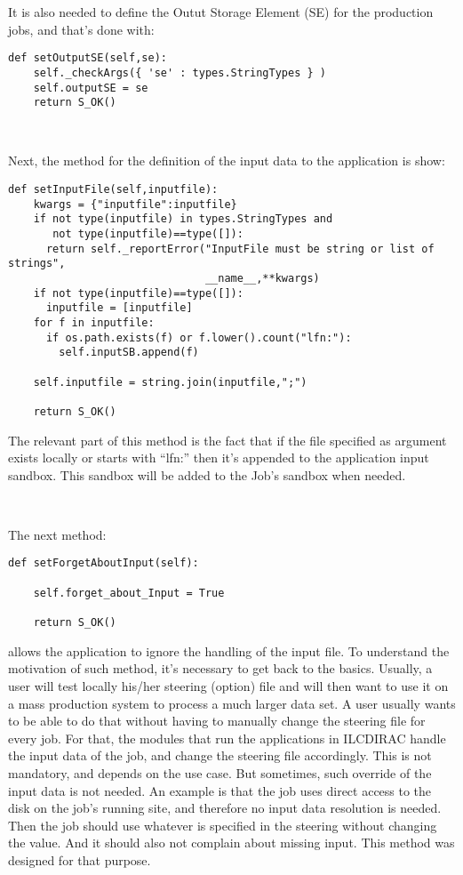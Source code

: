 \documentclass[a4paper,12pt]{article}
\begin{document}
It is also needed to define the Outut Storage Element (SE) for the production
jobs, and that's done with:
\begin{lstlisting}[firstnumber=210]  
  def setOutputSE(self,se):
    self._checkArgs({ 'se' : types.StringTypes } )
    self.outputSE = se
    return S_OK()
\end{lstlisting}

~

Next, the method for the definition of the input data to the application is
show:
\begin{lstlisting}[firstnumber=221]  
  def setInputFile(self,inputfile):
    kwargs = {"inputfile":inputfile}
    if not type(inputfile) in types.StringTypes and 
       not type(inputfile)==type([]):
      return self._reportError("InputFile must be string or list of strings",
                               __name__,**kwargs)
    if not type(inputfile)==type([]):
      inputfile = [inputfile]
    for f in inputfile:
      if os.path.exists(f) or f.lower().count("lfn:"):
        self.inputSB.append(f)
        
    self.inputfile = string.join(inputfile,";")

    return S_OK()
\end{lstlisting}
The relevant part of this method is the fact that if the file specified as
argument exists locally or starts with ``lfn:'' then it's appended to the
application input sandbox. This sandbox will be added to the Job's sandbox when
needed.

~

The next method:
\begin{lstlisting}[firstnumber=240]  
  def setForgetAboutInput(self):
    
    self.forget_about_Input = True
    
    return S_OK()
\end{lstlisting}
allows the application to ignore the handling of the input file. To understand
the motivation of such method, it's necessary to get back to the basics.
Usually, a user will test locally his/her steering (option) file and will then
want to use it on a mass production system to process a much larger data set. A
user usually wants to be able to do that without having to manually change the
steering file for every job. For that, the modules that run the applications in
ILCDIRAC handle the input data of the job, and change the steering file
accordingly. This is not mandatory, and depends on the use case. But sometimes,
such override of the input data is not needed. An example is that the job uses
direct access to the disk on the job's running site, and therefore no input
data resolution is needed. Then the job should use whatever is specified in the
steering without changing the value. And it should also not complain about
missing input. This method was designed for that purpose.
\end{document}
